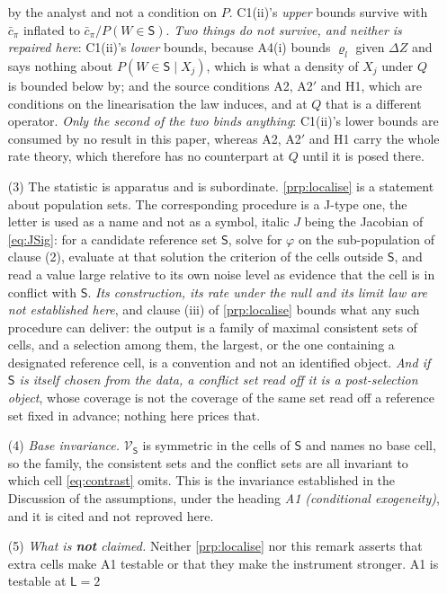 \begin{remark}
\begin{enumerate}
by the analyst and not a condition on $P$. C1(ii)'s \emph{upper} bounds survive with $\bar c_\pi$
inflated to $\bar c_\pi/P(W\in\mathsf S)$. \emph{Two things do not survive, and neither is repaired
here}: C1(ii)'s \emph{lower} bounds, because A4(i) bounds $\varrho_l$ given $\Delta Z$ and says nothing
about $P(W\in\mathsf S\mid X_j)$, which is what a density of $X_j$ under $Q$ is bounded below by; and the
source conditions A2, A2$'$ and H1, which are conditions on the linearisation the law induces, and at $Q$
that is a different operator. \emph{Only the second of the two binds anything}: C1(ii)'s lower bounds are
consumed by no result in this paper, whereas A2, A2$'$ and H1 carry the whole rate theory, which
therefore has no counterpart at $Q$ until it is posed there.
\item[(3)] The statistic is apparatus and is subordinate. \cref{prp:localise} is a statement about
population sets. The corresponding procedure is a J-type one, the letter is used as a name and not as
a symbol, italic $J$ being the Jacobian of \eqref{eq:JSig}: for a candidate reference set
$\mathsf S$, solve for $\varphi$ on the sub-population of clause \textup{(2)}, evaluate at that solution
the criterion of the cells outside $\mathsf S$, and read a value large relative to its own noise level as
evidence that the cell is in conflict with $\mathsf S$. \emph{Its construction, its rate under the null
and its limit law are not established here}, and clause \textup{(iii)} of \cref{prp:localise} bounds what
any such procedure can deliver: the output is a family of maximal consistent sets of cells, and a
selection among them, the largest, or the one containing a designated reference cell, is a
convention and not an identified object. \emph{And if $\mathsf S$ is itself chosen from the data, a
conflict set read off it is a post-selection object}, whose coverage is not the coverage of the same set
read off a reference set fixed in advance; nothing here prices that.
\item[(4)] \emph{Base invariance.} $\mathcal V_{\mathsf S}$ is symmetric in the cells of $\mathsf S$ and
names no base cell, so the family, the consistent sets and the conflict sets are all invariant to which
cell \eqref{eq:contrast} omits. This is the invariance established in the Discussion of the assumptions,
under the heading \emph{A1 (conditional exogeneity)}, and it is cited and not reproved here.
\item[(5)] \emph{What is \textbf{not} claimed.} Neither \cref{prp:localise} nor this remark asserts that
extra cells make A1 testable or that they make the instrument stronger. A1 is testable at $\mathsf L=2$

\end{enumerate}
\end{remark}
